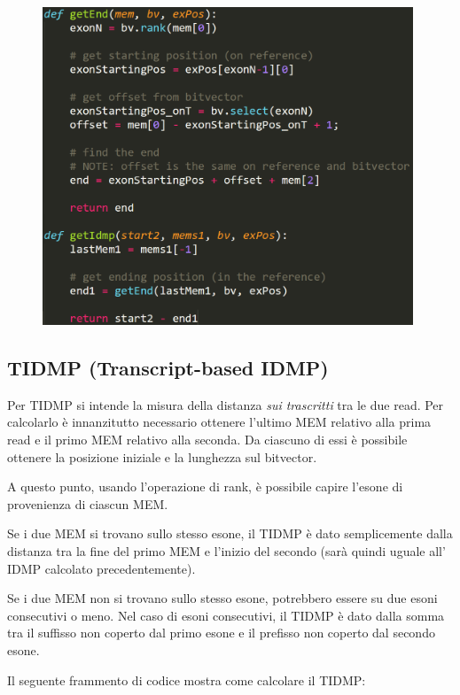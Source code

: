\begin{figure}[h!]
	\centering
	\includegraphics[width=\linewidth, height=9.5cm]{images/getIDMP.png}
  \label{fig:GetIDMP}
\end{figure}

\newpage

\subsection{TIDMP (Transcript-based IDMP)}
Per TIDMP si intende la misura della distanza \textit{sui trascritti} tra le due read. Per calcolarlo è innanzitutto necessario ottenere l'ultimo MEM relativo alla prima read e il primo MEM relativo alla seconda. Da ciascuno di essi è possibile ottenere la posizione iniziale e la lunghezza sul bitvector. 

A questo punto, usando l'operazione di rank, è possibile capire l'esone di provenienza di ciascun MEM.

Se i due MEM si trovano sullo stesso esone, il TIDMP è dato semplicemente dalla distanza tra la fine del primo MEM e l'inizio del secondo (sarà quindi uguale all' IDMP calcolato precedentemente).

Se i due MEM non si trovano sullo stesso esone, potrebbero essere su due esoni consecutivi o meno. Nel caso di esoni consecutivi, il TIDMP è dato dalla somma tra il suffisso non coperto dal primo esone e il prefisso non coperto dal secondo esone.

Il seguente frammento di codice mostra come calcolare il TIDMP:


